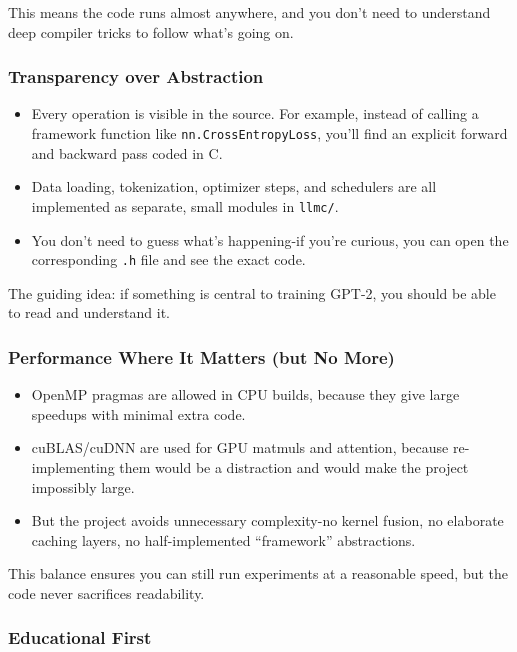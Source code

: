 \documentclass[
  letterpaper,
  DIV=11,
  numbers=noendperiod]{scrreprt}
\providecommand{\tightlist}{%
  \setlength{\itemsep}{0pt}\setlength{\parskip}{0pt}}
\begin{document}
This means the code runs almost anywhere, and you don't need to
understand deep compiler tricks to follow what's going on.

\subsubsection{Transparency over
Abstraction}\label{transparency-over-abstraction}

\begin{itemize}
\tightlist
\item
  Every operation is visible in the source. For example, instead of
  calling a framework function like \texttt{nn.CrossEntropyLoss}, you'll
  find an explicit forward and backward pass coded in C.
\item
  Data loading, tokenization, optimizer steps, and schedulers are all
  implemented as separate, small modules in \texttt{llmc/}.
\item
  You don't need to guess what's happening-if you're curious, you can
  open the corresponding \texttt{.h} file and see the exact code.
\end{itemize}

The guiding idea: if something is central to training GPT-2, you should
be able to read and understand it.

\subsubsection{Performance Where It Matters (but No
More)}\label{performance-where-it-matters-but-no-more}

\begin{itemize}
\tightlist
\item
  OpenMP pragmas are allowed in CPU builds, because they give large
  speedups with minimal extra code.
\item
  cuBLAS/cuDNN are used for GPU matmuls and attention, because
  re-implementing them would be a distraction and would make the project
  impossibly large.
\item
  But the project avoids unnecessary complexity-no kernel fusion, no
  elaborate caching layers, no half-implemented ``framework''
  abstractions.
\end{itemize}

This balance ensures you can still run experiments at a reasonable
speed, but the code never sacrifices readability.

\subsubsection{Educational First}\label{educational-first}
\end{document}

